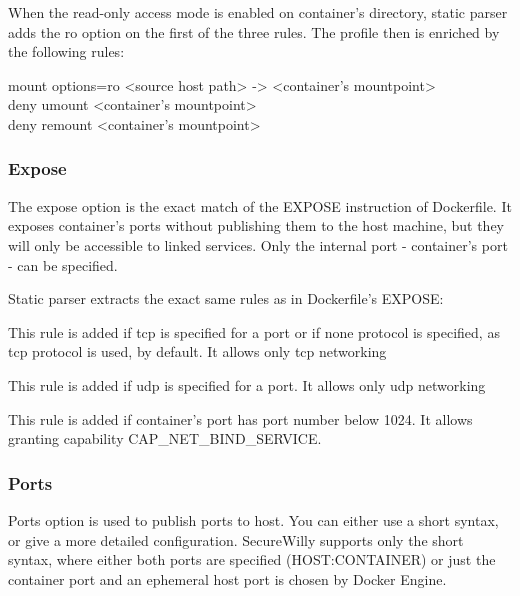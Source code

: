When the read-only access mode is enabled on container's directory, static parser adds the ro option on the first of the three rules. The profile then is enriched by the following rules:
\begin{description}
\item[mount options=ro \textless source host path\textgreater{} -\textgreater{} \textless container's mountpoint\textgreater{}]
\item[deny umount \textless container's mountpoint\textgreater{}]
\item[deny remount \textless container's mountpoint\textgreater{}]
\end{description}

\subsubsection{Expose}

The expose option is the exact match of the EXPOSE instruction of Dockerfile. It exposes container's ports without publishing them to the host machine, but they will only be accessible to linked services. Only the internal port - container's port - can be specified.

Static parser extracts the exact same rules as in Dockerfile's EXPOSE:
\begin{description}[style=nextline]
\item[network tcp]
This rule is added if tcp is specified for a port or if none protocol is specified, as tcp protocol is used, by default. It allows only tcp networking
\item[network udp]
This rule is added if udp is specified for a port. It allows only udp networking
\item[capability net\_bind\_service]
This rule is added if container's port has port number below 1024. It allows granting capability CAP\_NET\_BIND\_SERVICE.
\end{description}

\subsubsection{Ports}

Ports option is used to publish ports to host. You can either use a short syntax, or give a more detailed configuration. SecureWilly supports only the short syntax, where either both ports are specified (HOST:CONTAINER) or just the container port and an ephemeral host port is chosen by Docker Engine.

